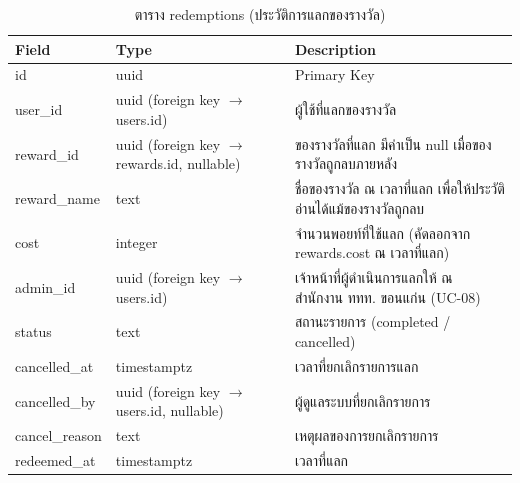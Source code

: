 \begin{table}[H]
\centering
\caption{ตาราง redemptions (ประวัติการแลกของรางวัล)}
\label{tab:db_redemptions}
\begin{tabular}{|p{3.6cm}|p{2.6cm}|p{6.8cm}|}
\hline
\textbf{Field} & \textbf{Type} & \textbf{Description} \\
\hline
id & uuid & Primary Key \\ \hline
user\_id & uuid (foreign key $\to$ users.id) & ผู้ใช้ที่แลกของรางวัล \\ \hline
reward\_id & uuid (foreign key $\to$ rewards.id, nullable) & ของรางวัลที่แลก มีค่าเป็น null เมื่อของรางวัลถูกลบภายหลัง \\ \hline
reward\_name & text & ชื่อของรางวัล ณ เวลาที่แลก เพื่อให้ประวัติอ่านได้แม้ของรางวัลถูกลบ \\ \hline
cost & integer & จำนวนพอยท์ที่ใช้แลก (คัดลอกจาก rewards.cost ณ เวลาที่แลก) \\ \hline
admin\_id & uuid (foreign key $\to$ users.id) & เจ้าหน้าที่ผู้ดำเนินการแลกให้ ณ สำนักงาน ททท. ขอนแก่น (UC-08) \\ \hline
status & text & สถานะรายการ (completed / cancelled) \\ \hline
cancelled\_at & timestamptz & เวลาที่ยกเลิกรายการแลก \\ \hline
cancelled\_by & uuid (foreign key $\to$ users.id, nullable) & ผู้ดูแลระบบที่ยกเลิกรายการ \\ \hline
cancel\_reason & text & เหตุผลของการยกเลิกรายการ \\ \hline
redeemed\_at & timestamptz & เวลาที่แลก \\
\hline
\end{tabular}
\end{table}

